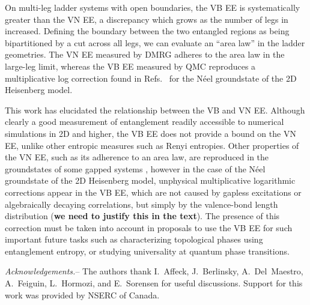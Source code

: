 \documentclass[prl,aps,twocolumn,floatfix,amsmath,amssymb,superscriptaddress,tightenlines]{revtex4}
\begin{document}
On multi-leg ladder systems with open boundaries, the VB EE is
systematically greater than the VN EE, a discrepancy which grows as the
number of legs in increased.  Defining the boundary between the two
entangled regions as being bipartitioned by a cut across all legs, we can
evaluate an ``area law'' in the ladder geometries.  The VN EE measured by
DMRG adheres to the area law in the large-leg limit, whereas the VB EE
measured by QMC reproduces a multiplicative log correction found in
Refs.~\cite{Alet,Chh} for the N\'eel groundstate of the 2D Heisenberg
model.

This work has elucidated the relationship between the VB and VN EE.
Although clearly a good measurement of entanglement readily accessible to
numerical simulations in 2D and higher, the VB EE does not provide a bound
on the VN EE, unlike other entropic measures such as Renyi entropies.
Other properties of the VN EE, such as its adherence to an area law, are
reproduced in the groundstates of some gapped systems \cite{Alet,Chh},
however in the case of the N\'eel groundstate of the 2D Heisenberg model,
unphysical multiplicative logarithmic corrections appear in the VB EE,
which are not caused by gapless excitations or algebraically decaying
correlations, but simply by the valence-bond length distribution ({\bf we
need to justify this in the text}).  The presence of this correction must
be taken into account in proposals to use the VB EE for such important
future tasks such as characterizing topological phases using entanglement
entropy, or studying universality at quantum phase transitions.

{\it Acknowledgements.}-- The authors thank I.~Affeck, J.~Berlinsky,
A.~Del~Maestro, A.~Feiguin, L.~Hormozi, and E.~Sorensen for useful
discussions. Support for this work was provided by NSERC of Canada.



\end{document}
